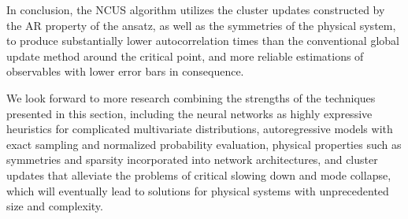 In conclusion, the NCUS algorithm utilizes the cluster updates constructed by the AR property of the ansatz, as well as the symmetries of the physical system, to produce substantially lower autocorrelation times than the conventional global update method around the critical point, and more reliable estimations of observables with lower error bars in consequence.

We look forward to more research combining the strengths of the techniques presented in this section, including the neural networks as highly expressive heuristics for complicated multivariate distributions, autoregressive models with exact sampling and normalized probability evaluation, physical properties such as symmetries and sparsity incorporated into network architectures, and cluster updates that alleviate the problems of critical slowing down and mode collapse, which will eventually lead to solutions for physical systems with unprecedented size and complexity.
